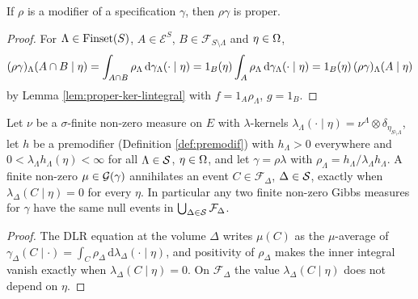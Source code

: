 \begin{lemma}
    \label{lem:modif-proper}
    \leanok{}

    If $\rho$ is a modifier of a specification $\gamma$, then $\rho\gamma$ is proper.
\end{lemma}
\begin{proof}
    \leanok

    For $\Lambda \in \operatorname{Finset}(S)$, $A \in \mathcal E^S$, $B \in \mathcal{F}_{S\setminus\Lambda}$
    and $\eta \in \Omega$,
    \[(\rho\gamma)_\Lambda(A \cap B \mid \eta)
      = \int_{A \cap B} \rho_\Lambda \,\mathrm{d}\gamma_\Lambda(\cdot\mid\eta)
      = 1_B(\eta) \int_{A} \rho_\Lambda \,\mathrm{d}\gamma_\Lambda(\cdot\mid\eta)
      = 1_B(\eta)\,(\rho\gamma)_\Lambda(A \mid \eta)\]
    by Lemma \ref{lem:proper-ker-lintegral} with $f = 1_A\rho_\Lambda$, $g = 1_B$.
\end{proof}

\begin{lemma}
    \label{lem:remark-128-2}
    \leanok

    Let $\nu$ be a $\sigma$-finite non-zero measure on $E$ with $\lambda$-kernels
    $\lambda_\Lambda(\cdot \mid \eta) = \nu^\Lambda \otimes \delta_{\eta_{S \setminus \Lambda}}$,
    let $h$ be a premodifier (Definition \ref{def:premodif}) with $h_\Lambda > 0$ everywhere
    and $0 < \lambda_\Lambda h_\Lambda(\eta) < \infty$ for all $\Lambda \in \mathcal{S}$, $\eta \in \Omega$,
    and let $\gamma = \rho\lambda$ with $\rho_\Lambda = h_\Lambda / \lambda_\Lambda h_\Lambda$.
    A finite non-zero $\mu \in \mathcal{G}(\gamma)$ annihilates an event $C \in \mathcal{F}_\Delta$,
    $\Delta \in \mathcal{S}$, exactly when $\lambda_\Delta(C \mid \eta) = 0$ for every $\eta$. In
    particular any two finite non-zero Gibbs measures for $\gamma$ have the same null events in
    $\bigcup_{\Delta \in \mathcal{S}} \mathcal{F}_\Delta$.
\end{lemma}
\begin{proof}
    \leanok

    The DLR equation at the volume $\Delta$ writes $\mu(C)$ as the $\mu$-average of
    $\gamma_\Delta(C \mid \cdot) = \int_C \rho_\Delta \, \mathrm{d}\lambda_\Delta(\cdot\mid\eta)$,
    and positivity of $\rho_\Delta$ makes the inner integral vanish exactly when
    $\lambda_\Delta(C \mid \eta) = 0$. On $\mathcal{F}_\Delta$ the value
    $\lambda_\Delta(C \mid \eta)$ does not depend on $\eta$.
\end{proof}

